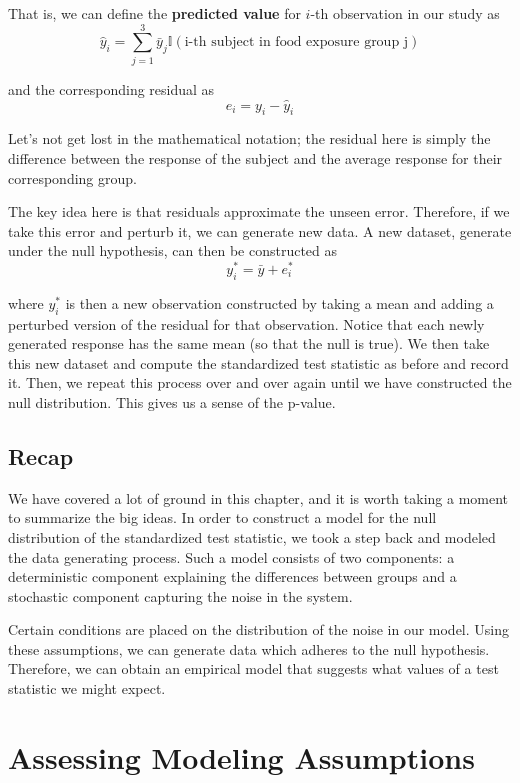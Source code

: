 \documentclass[]{book}
\theoremstyle{definition}
\theoremstyle{definition}
\theoremstyle{remark}
\begin{document}
That is, we can define the \textbf{predicted value} for \(i\)-th
observation in our study as \[
\widehat{y}_i = \sum_{j=1}^{3} \bar{y}_j \mathbb{I}(\text{i-th subject in food exposure group j})
\]

and the corresponding residual as \[
e_i = y_i - \widehat{y}_i
\]

Let's not get lost in the mathematical notation; the residual here is
simply the difference between the response of the subject and the
average response for their corresponding group.

The key idea here is that residuals approximate the unseen error.
Therefore, if we take this error and perturb it, we can generate new
data. A new dataset, generate under the null hypothesis, can then be
constructed as \[
y_i^* = \bar{y} + e_i^*
\]

where \(y_i^*\) is then a new observation constructed by taking a mean
and adding a perturbed version of the residual for that observation.
Notice that each newly generated response has the same mean (so that the
null is true). We then take this new dataset and compute the
standardized test statistic as before and record it. Then, we repeat
this process over and over again until we have constructed the null
distribution. This gives us a sense of the p-value.

\section{Recap}\label{recap}

We have covered a lot of ground in this chapter, and it is worth taking
a moment to summarize the big ideas. In order to construct a model for
the null distribution of the standardized test statistic, we took a step
back and modeled the data generating process. Such a model consists of
two components: a deterministic component explaining the differences
between groups and a stochastic component capturing the noise in the
system.

Certain conditions are placed on the distribution of the noise in our
model. Using these assumptions, we can generate data which adheres to
the null hypothesis. Therefore, we can obtain an empirical model that
suggests what values of a test statistic we might expect.

\chapter{Assessing Modeling Assumptions}\label{ANOVAassessment}
\end{document}
